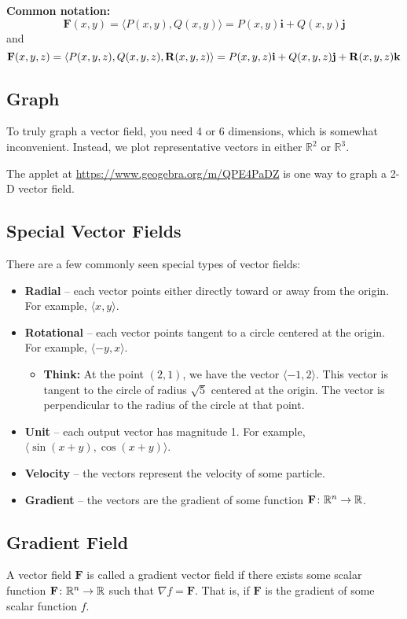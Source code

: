 \textbf{Common notation:}
\[ \mathbf{F}(x, y) = \langle P(x, y), Q(x, y) \rangle = P(x, y) \mathbf{i} + Q(x, y) \mathbf{j} \]
and
\[ \mathbf{F}(x, y, z) = \langle P(x, y, z), Q(x, y, z), \mathbf{R}(x, y, z) \rangle = P(x, y, z) \mathbf{i} + Q(x, y, z) \mathbf{j} + \mathbf{R}(x, y, z) \mathbf{k} \]

\subsection{Graph}
To truly graph a vector field, you need 4 or 6 dimensions, which is somewhat inconvenient. Instead, we plot representative vectors in either \( \mathbb{R}^2 \) or \( \mathbb{R}^3 \).

The applet at \url{https://www.geogebra.org/m/QPE4PaDZ} is one way to graph a 2-D vector field.

\subsection{Special Vector Fields}
There are a few commonly seen special types of vector fields:

\begin{itemize}
    \item \textbf{Radial} – each vector points either directly toward or away from the origin. For example, \( \langle x, y \rangle \).
    \item \textbf{Rotational} – each vector points tangent to a circle centered at the origin. For example, \( \langle -y, x \rangle \).
    \begin{itemize}
        \item \textbf{Think:} At the point \((2,1)\), we have the vector \(\langle -1, 2 \rangle\). This vector is tangent to the circle of radius \(\sqrt{5}\) centered at the origin. The vector is perpendicular to the radius of the circle at that point.
    \end{itemize}
    \item \textbf{Unit} – each output vector has magnitude 1. For example, \( \langle \sin(x + y), \cos(x + y) \rangle \).
    \item \textbf{Velocity} – the vectors represent the velocity of some particle.
    \item \textbf{Gradient} – the vectors are the gradient of some function \( \mathbf{F} \colon \mathbb{R}^n \to \mathbb{R} \).
\end{itemize}

\subsection{Gradient Field}
A vector field \( \mathbf{F} \) is called a gradient vector field if there exists some scalar function \( \mathbf{F} \colon \mathbb{R}^n \to \mathbb{R} \) such that \( \nabla f = \mathbf{F} \). That is, if \( \mathbf{F} \) is the gradient of some scalar function \( f \).

